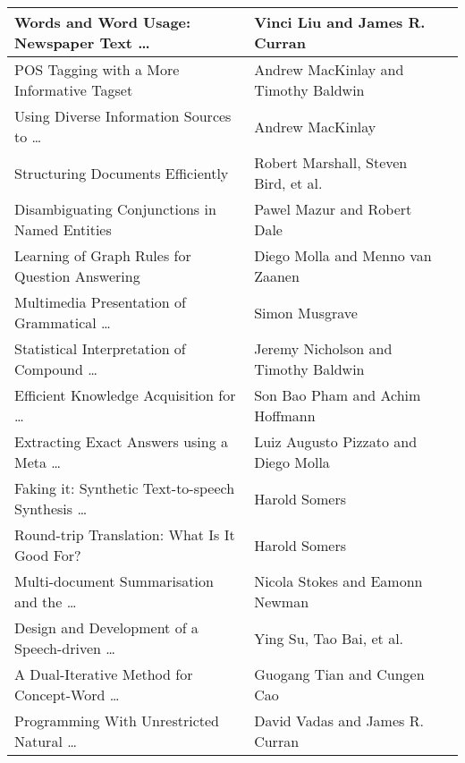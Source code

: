 \documentclass{article}
\begin{document}
\begin{center}
\begin{tabular}{|p{}|p{}||p{}|}
Words and Word Usage: Newspaper Text \ldots &
Vinci Liu and James R. Curran &
\\ \hline

POS Tagging with a More Informative Tagset &
Andrew MacKinlay and Timothy Baldwin &
\\ \hline

Using Diverse Information Sources to \ldots &
Andrew MacKinlay &
\\ \hline

Structuring Documents Efficiently &
Robert Marshall, Steven Bird, et al. &
\\ \hline

Disambiguating Conjunctions in Named Entities &
Pawel Mazur and Robert Dale &
\\ \hline

Learning of Graph Rules for Question Answering &
Diego Molla and Menno van Zaanen &
\\ \hline

Multimedia Presentation of Grammatical \ldots &
Simon Musgrave &
\\ \hline

Statistical Interpretation of Compound \ldots &
Jeremy Nicholson and Timothy Baldwin &
\\ \hline

Efficient Knowledge Acquisition for \ldots &
Son Bao Pham and Achim Hoffmann &
\\ \hline

Extracting Exact Answers using a Meta \ldots &
Luiz Augusto Pizzato and Diego Molla &
\\ \hline

Faking it: Synthetic Text-to-speech Synthesis \ldots &
Harold Somers &
\\ \hline

Round-trip Translation: What Is It Good For? &
Harold Somers &
\\ \hline

Multi-document Summarisation and the \ldots &
Nicola Stokes and Eamonn Newman &
\\ \hline

Design and Development of a Speech-driven \ldots &
Ying Su, Tao Bai, et al. &
\\ \hline

A Dual-Iterative Method for Concept-Word \ldots &
Guogang Tian and Cungen Cao &
\\ \hline

Programming With Unrestricted Natural \ldots &
David Vadas and James R. Curran &
\\ \hline


\end{tabular}
\end{center}
\end{document}
